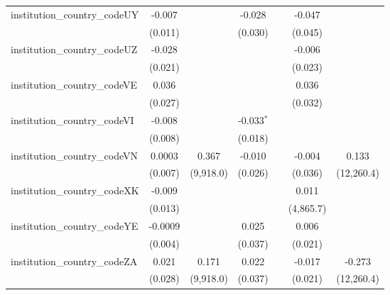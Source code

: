 \begin{tabular}{lcccccc}
   institution\_country\_codeUY          & -0.007         &               & -0.028        &              & -0.047       &   \\   
                                         & (0.011)        &               & (0.030)       &              & (0.045)      &   \\   
   institution\_country\_codeUZ          & -0.028         &               &               &              & -0.006       &   \\   
                                         & (0.021)        &               &               &              & (0.023)      &   \\   
   institution\_country\_codeVE          & 0.036          &               &               &              & 0.036        &   \\   
                                         & (0.027)        &               &               &              & (0.032)      &   \\   
   institution\_country\_codeVI          & -0.008         &               & -0.033$^{*}$  &              &              &   \\   
                                         & (0.008)        &               & (0.018)       &              &              &   \\   
   institution\_country\_codeVN          & 0.0003         & 0.367         & -0.010        &              & -0.004       & 0.133\\   
                                         & (0.007)        & (9,918.0)     & (0.026)       &              & (0.036)      & (12,260.4)\\   
   institution\_country\_codeXK          & -0.009         &               &               &              & 0.011        &   \\   
                                         & (0.013)        &               &               &              & (4,865.7)    &   \\   
   institution\_country\_codeYE          & -0.0009        &               & 0.025         &              & 0.006        &   \\   
                                         & (0.004)        &               & (0.037)       &              & (0.021)      &   \\   
   institution\_country\_codeZA          & 0.021          & 0.171         & 0.022         &              & -0.017       & -0.273\\   
                                         & (0.028)        & (9,918.0)     & (0.037)       &              & (0.021)      & (12,260.4)\\   

\end{tabular}
